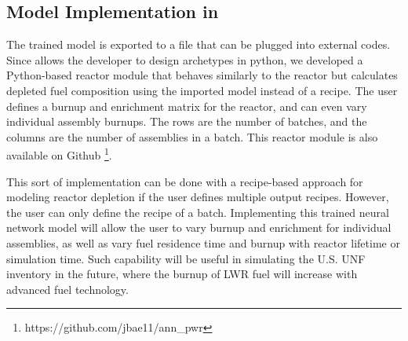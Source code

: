 \subsection{Model Implementation in \Cyclus}

The trained model is exported to a file
that can be plugged into external codes. Since \Cyclus
allows the developer
to design archetypes in python, we developed a Python-based reactor
module that behaves similarly to the \Cycamore reactor
but calculates depleted fuel composition using the
imported model instead of a recipe. The user defines a burnup
and enrichment
matrix for the reactor, and can even vary individual
assembly burnups. The rows are the number
of batches, and the columns are the number of
assemblies in a batch. This reactor module is also
available on Github \footnote{https://github.com/jbae11/ann\_pwr}.

This sort of implementation can be done with
a recipe-based approach for modeling reactor depletion
if the user defines multiple
output recipes. However, the user can only define
the recipe of a batch.
Implementing this trained neural network model will allow the user to vary
burnup and enrichment for individual assemblies, as well
as vary fuel residence time and burnup with reactor
lifetime or simulation time. Such capability will be
useful in simulating the U.S. \gls{UNF} inventory in the future,
where the burnup of \gls{LWR} fuel will increase
with advanced fuel technology.